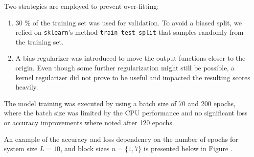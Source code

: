 \documentclass[reprint,amsmath,amssymb,aps,prb]{revtex4-2}
\begin{document}
Two strategies are employed to prevent over-fitting:
\begin{enumerate}
	\item $30$ \% of the training set was used for validation. To avoid a biased split, we relied on \texttt{sklearn}'s method \texttt{train\_test\_split} that samples randomly from the training set.
	\item A bias regularizer was introduced to move the output functions closer to the origin. Even though some further regularization might still be possible, a kernel regularizer did not prove to be useful and impacted the resulting scores heavily.
\end{enumerate}

The model training was executed by using a batch size of 70 and 200 epochs, where the batch size was limited by the CPU performance and no significant loss or accuracy improvements where noted after 120 epochs.

An example of the accuracy and loss dependency on the number of epochs for system size $L=10$, and block sizes $n=\{1, 7\}$ is presented below in Figure \label{fig:val_acc}.%
\end{document}
